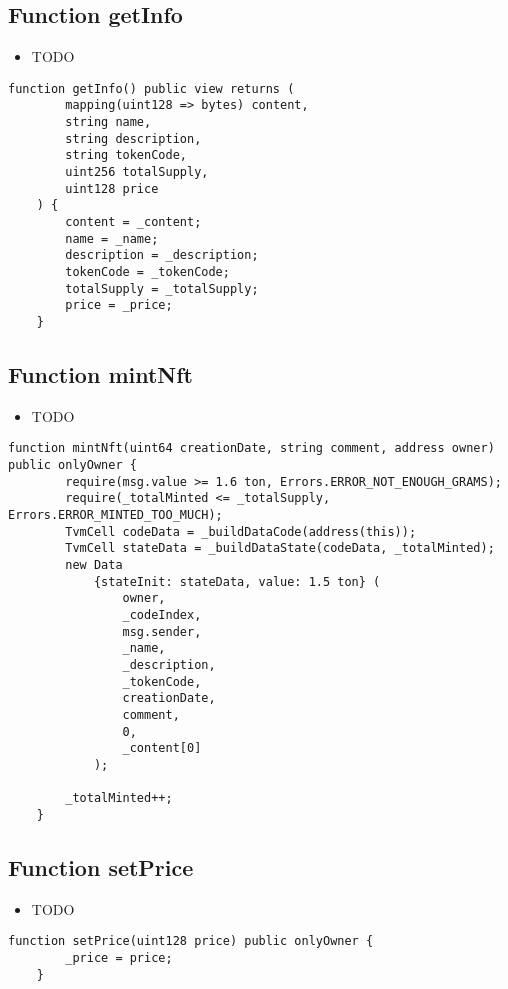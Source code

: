 \subsection{Function getInfo}

\begin{itemize}
\item TODO
\end{itemize}

\begin{lstlisting}[firstnumber=103]
    function getInfo() public view returns (
        mapping(uint128 => bytes) content,
        string name,
        string description,
        string tokenCode,
        uint256 totalSupply,
        uint128 price
    ) {
        content = _content;
        name = _name;
        description = _description;
        tokenCode = _tokenCode;
        totalSupply = _totalSupply;
        price = _price;
    }
\end{lstlisting}

\subsection{Function mintNft}

\begin{itemize}
\item TODO
\end{itemize}

\begin{lstlisting}[firstnumber=63]
    function mintNft(uint64 creationDate, string comment, address owner) public onlyOwner {
        require(msg.value >= 1.6 ton, Errors.ERROR_NOT_ENOUGH_GRAMS);
        require(_totalMinted <= _totalSupply, Errors.ERROR_MINTED_TOO_MUCH);
        TvmCell codeData = _buildDataCode(address(this));
        TvmCell stateData = _buildDataState(codeData, _totalMinted);
        new Data
            {stateInit: stateData, value: 1.5 ton} (
                owner,
                _codeIndex,
                msg.sender,
                _name,
                _description,
                _tokenCode,
                creationDate,
                comment,
                0,
                _content[0]
            );

        _totalMinted++;
    }
\end{lstlisting}

\subsection{Function setPrice}

\begin{itemize}
\item TODO
\end{itemize}

\begin{lstlisting}[firstnumber=119]
    function setPrice(uint128 price) public onlyOwner {
        _price = price;
    }
\end{lstlisting}
